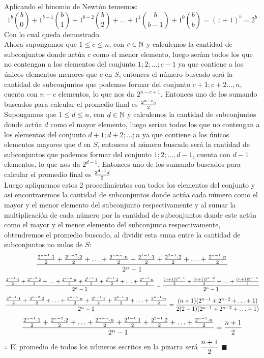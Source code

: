 \documentclass{book}
\begin{document}
\begin{enumerate}
				Aplicando el binomio de Newtón tememos:
				$$1^b {b \choose 0}+1^{b-1} {b \choose 1}+1^{b-2} {b \choose 2}+\ldots +1^1 {b \choose {b-1}}+1^0 {b \choose b}={(1+1)}^b=2^b$$
				Con lo cual queda demostrado.\\
				Ahora supongamos que $1\leq c\leq n$, con $c\in \mathbb{N}$ y calculemos la cantidad de subconjuntos donde actúa $c$ como el menor elemento, luego serían todos los que no contengan a los elementos del conjunto ${1;2;\ldots;c-1}$ ya que contiene a los únicos elementos menores que $c$ en $S$, entonces el número buscado será la cantidad de subconjuntos que podemos formar del conjunto ${c+1;c+2\ldots ,n}$, cuenta con $n-c$ elementos, lo que nos da $2^{n-c+1}$. Entonces uno de los sumando buscados para calcular el promedio final es ${2^{n-c}c\over 2}$\\
				Supongamos que $1\leq d\leq n$, con $d\in \mathbb{N}$ y calculemos la cantidad de subconjuntos donde actúa $d$ como el mayor elemento, luego serían todos los que no contengan a los elementos del conjunto ${d+1;d+2;\ldots;n}$ ya que contiene a los únicos elementos mayores que $d$ en $S$, entonces el número buscado será la cantidad de subconjuntos que podemos formar del conjunto ${1;2;\ldots ,d-1}$, cuenta con $d-1$ elementos, lo que nos da $2^{d-1}$. Entonces uno de los sumando buscados para calcular el promedio final es ${2^{d-1}d\over 2}$\\
				Luego apliquemos estos 2 procedimientos con todos los elementos del conjunto y así encontraremos la cantidad de subconjuntos donde actúa cada número como el mayor y el menor elemento del subconjunto respectivamente y al sumar la multiplicación de cada número por la cantidad de subconjuntos donde este actúa como el mayor y el menor elemento del subconjunto respectivamente, obtendremos el promedio buscado, al dividir esta suma entre la cantidad de subconjuntos no nulos de $S$:
				$$\frac{{2^{n-1}\cdot 1\over 2}+{2^{n-2}\cdot 2\over 2}+\ldots+{2^{n-n}\cdot n\over 2}+{2^{1-1}\cdot 1\over 2}+{2^{2-1}\cdot 2\over 2}+\ldots+{2^{n-1}\cdot n\over 2}}{2^n-1}$$ 
				$$\frac{{2^{n-1}\cdot 1\over 2}+{2^{n-2}\cdot 2\over 2}+\ldots+{2^{n-n}\cdot n\over 2}+{2^{1-1}\cdot 1\over 2}+{2^{2-1}\cdot 2\over 2}+\ldots+{2^{n-1}\cdot n\over 2}}{2^n-1}=\frac{{(n+1)2^{n-1}\over 2}+{(n+1)2^{n-2}\over 2}+\ldots+{(n+1)2^{n-n}\over 2}}{2^n-1}$$
				$$\frac{{2^{n-1}\cdot 1\over 2}+{2^{n-2}\cdot 2\over 2}+\ldots+{2^{n-n}\cdot n\over 2}+{2^{1-1}\cdot 1\over 2}+{2^{2-1}\cdot 2\over 2}+\ldots+{2^{n-1}\cdot n\over 2}}{2^n-1}=\frac{(n+1)(2^{n-1}+2^{n-2}+\ldots+1)}{2(2-1)(2^{n-1}+2^{n-2}+\ldots+1)}$$
				$$\frac{{2^{n-1}\cdot 1\over 2}+{2^{n-2}\cdot 2\over 2}+\ldots+{2^{n-n}\cdot n\over 2}+{2^{1-1}\cdot 1\over 2}+{2^{2-1}\cdot 2\over 2}+\ldots+{2^{n-1}\cdot n\over 2}}{2^n-1}={n+1 \over 2}$$
				$\therefore$ El promedio de todos los números escritos en la pizarra será $\displaystyle{{n+1 \over 2}}$ $\blacksquare$\\ 
			\end{enumerate}
							
\end{document}
